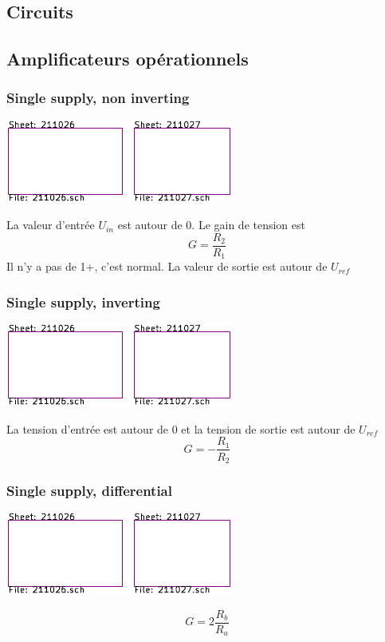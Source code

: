 \documentclass[]{article}
\begin{document}
\begin{multicols}{3}
\section{Circuits}
\subsection{Amplificateurs opérationnels}
\subsubsection{Single supply, non inverting}
\begin{center}
\includegraphics[width=0.7\columnwidth,page=3]{../KiCad/resume-crop.pdf}
\end{center}
La valeur d'entrée $U_{in}$ est autour de 0. Le gain de tension est
$$G=\frac{R_2}{R_1}$$
Il n'y a pas de 1+, c'est normal. La valeur de sortie est autour de $U_{ref}$
\subsubsection{Single supply, inverting}
\begin{center}
\includegraphics[width=0.7\columnwidth,page=4]{../KiCad/resume-crop.pdf}
\end{center}
La tension d'entrée est autour de 0 et la tension de sortie est autour de $U_{ref}$
$$G=-\frac{R_1}{R_2}$$
\subsubsection{Single supply, differential}
\begin{center}
\includegraphics[width=0.7\columnwidth,page=5]{../KiCad/resume-crop.pdf}
\end{center}
$$G=2\frac{R_b}{R_a}$$


\end{multicols}
\end{document}
